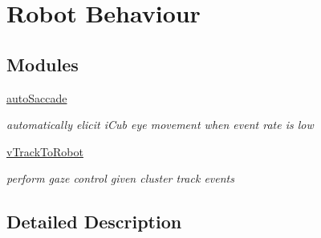 \hypertarget{group__robotBehaviour}{\section{Robot Behaviour}
\label{group__robotBehaviour}
}
\subsection*{Modules}
\begin{DoxyCompactItemize}
\item 
\hyperlink{group__autoSaccade}{auto\-Saccade}
\begin{DoxyCompactList}\small\item\em automatically elicit i\-Cub eye movement when event rate is low \end{DoxyCompactList}\item 
\hyperlink{group__vTrackToRobot}{v\-Track\-To\-Robot}
\begin{DoxyCompactList}\small\item\em perform gaze control given cluster track events \end{DoxyCompactList}\end{DoxyCompactItemize}


\subsection{Detailed Description}
